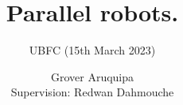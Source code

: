 \documentclass{beamer}
\title{\normalsize{Parallel robots.}}
\subtitle{\small{UBFC (15th March 2023)}}
\author{Grover Aruquipa\\
Supervision: Redwan Dahmouche}
\begin{document}
\begin{frame}[plain,c]
\titlepage
\end{frame}
























\end{document}
